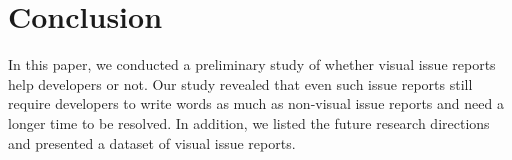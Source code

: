 \section{Conclusion}
\label{sec:conclusion}

In this paper, we conducted a preliminary study of 
whether visual issue reports help developers or not. 
Our study revealed that even such issue reports still 
require developers to write words as much as non-visual issue reports 
and need a longer time to be resolved. 
In addition, we listed the future research directions and 
presented a dataset of visual issue reports. 




